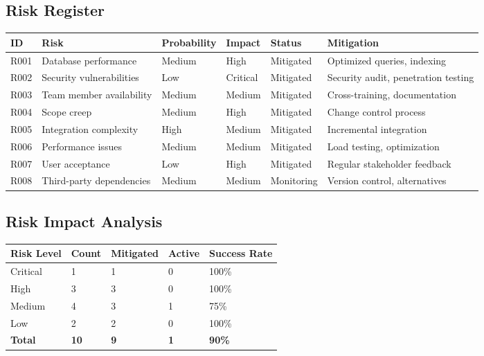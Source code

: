 \documentclass[12pt,a4paper]{article}
\begin{document}
\subsection{Risk Register}
\begin{longtable}{|p{1cm}|p{3cm}|p{2cm}|p{2cm}|p{2cm}|p{4cm}|}
\hline
\rowcolor{lightgray}
\textbf{ID} & \textbf{Risk} & \textbf{Probability} & \textbf{Impact} & \textbf{Status} & \textbf{Mitigation} \\
\hline
R001 & Database performance & Medium & High & \cellcolor{completedgreen}Mitigated & Optimized queries, indexing \\
\hline
R002 & Security vulnerabilities & Low & Critical & \cellcolor{completedgreen}Mitigated & Security audit, penetration testing \\
\hline
R003 & Team member availability & Medium & Medium & \cellcolor{completedgreen}Mitigated & Cross-training, documentation \\
\hline
R004 & Scope creep & Medium & High & \cellcolor{completedgreen}Mitigated & Change control process \\
\hline
R005 & Integration complexity & High & Medium & \cellcolor{completedgreen}Mitigated & Incremental integration \\
\hline
R006 & Performance issues & Medium & Medium & \cellcolor{completedgreen}Mitigated & Load testing, optimization \\
\hline
R007 & User acceptance & Low & High & \cellcolor{completedgreen}Mitigated & Regular stakeholder feedback \\
\hline
R008 & Third-party dependencies & Medium & Medium & \cellcolor{inprogressblue}Monitoring & Version control, alternatives \\
\hline
\end{longtable}

\subsection{Risk Impact Analysis}
\begin{longtable}{|p{2cm}|p{3cm}|p{3cm}|p{3cm}|p{3cm}|}
\hline
\rowcolor{lightgray}
\textbf{Risk Level} & \textbf{Count} & \textbf{Mitigated} & \textbf{Active} & \textbf{Success Rate} \\
\hline
Critical & 1 & 1 & 0 & 100\% \\
\hline
High & 3 & 3 & 0 & 100\% \\
\hline
Medium & 4 & 3 & 1 & 75\% \\
\hline
Low & 2 & 2 & 0 & 100\% \\
\hline
\textbf{Total} & \textbf{10} & \textbf{9} & \textbf{1} & \textbf{90\%} \\
\hline
\end{longtable}
\end{document}
